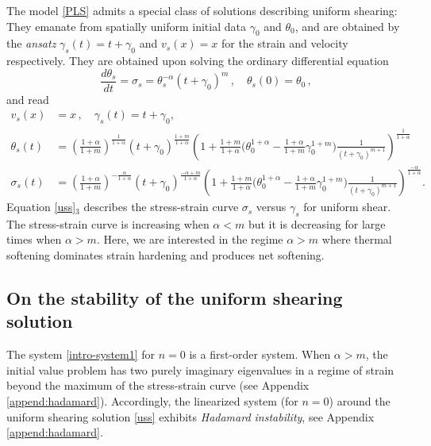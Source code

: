 \documentclass[usletter,11pt]{article}
\theoremstyle{remark}
\begin{document}
The model \eqref{PLS} admits  a special class of solutions describing uniform shearing: They emanate
from spatially uniform initial data $\gamma_0$ and $\theta_0$, and are obtained by the {\it ansatz} $\gamma_s (t) = t + \gamma_0 $ and $v_s (x) = x$ 
for the strain and velocity respectively. They are obtained 
upon solving the ordinary differential equation
\begin{equation}
\label{uss2}
\frac{d \theta_s }{dt} = \sigma_s = \theta_s^{-\alpha} (t + \gamma_0)^m \, , \quad \theta_s(0) = \theta_0 \, ,
\end{equation}
and read
\begin{equation} \label{uss}
\begin{aligned}
v_s (x)  &=x \, ,   \quad  \gamma_s(t) = t+\gamma_0,  \quad 
\\
\theta_s(t) &=  \left( \tfrac{1+\alpha}{1+m }\right )^{\frac{1}{1+\alpha}}  (t+\gamma_0)^{\frac{1 + m}{1+\alpha}} 
 \left( 1 +  \tfrac{1+m}{1+\alpha} \big (  \theta_0^{1+\alpha}  - \tfrac{1+\alpha}{1+m} \gamma_0^{1+m} \big ) \tfrac{1}{(t+\gamma_0)^{m+1}}  \right)^{\frac{1}{1+\alpha}}
 \\
  \sigma_s(t)&=
   \left( \tfrac{1+\alpha}{1+m}\right )^{-\frac{\alpha}{1+\alpha}}  (t+\gamma_0)^{\frac{-\alpha + m}{1+\alpha}}  
   \left( 1 +  \tfrac{1+m}{1+\alpha} \big (  \theta_0^{1+\alpha}  - \tfrac{1+\alpha}{1+m} \gamma_0^{1+m} \big ) \tfrac{1}{(t+\gamma_0)^{m+1}}  \right)^{\frac{-\alpha}{1+\alpha}} .
\end{aligned}
\end{equation}
Equation \eqref{uss}$_3$ describes the stress-strain curve $\sigma_s$ versus $\gamma_s$ for uniform shear.
The stress-strain curve is increasing when $\alpha < m$ but it is decreasing for large times when $\alpha > m$.
Here, we are interested in the regime $\alpha > m$ where thermal softening dominates strain hardening and produces net softening.



\subsection{On the stability of the uniform shearing solution}

The system \eqref{intro-system1} for $n=0$ is a first-order system. When $\alpha > m$, the initial value problem  has two purely imaginary eigenvalues in a regime 
of strain beyond the maximum of the stress-strain curve (see Appendix \ref{append:hadamard}). 
Accordingly, the linearized system (for $n=0$) around the uniform shearing solution \eqref{uss} exhibits {\it Hadamard instability}, see Appendix \ref{append:hadamard}.
\end{document}
